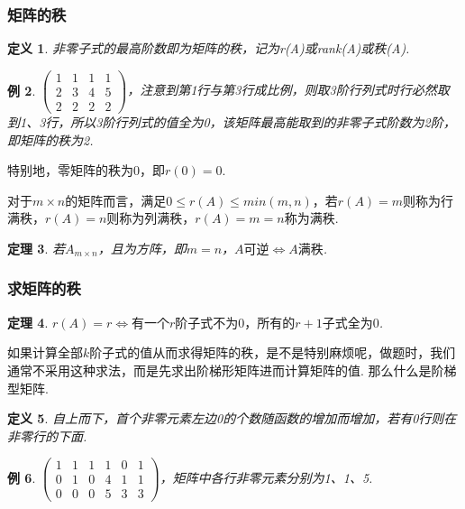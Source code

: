 \documentclass[12pt, a4paper, oneside]{ctexbook}
\newtheorem{theorem}{定理}[section]
\newtheorem{definition}[theorem]{定义}
\newtheorem{example}[theorem]{例}
\begin{document}
\subsubsection{矩阵的秩}

\begin{definition}
    非零子式的最高阶数即为矩阵的秩，记为r(A)或rank(A)或秩(A). 
\end{definition}

\begin{example}
    $\begin{pmatrix}
        1 & 1 & 1 & 1 \\
        2 & 3 & 4 & 5 \\
        2 & 2 & 2 & 2
    \end{pmatrix}$，注意到第1行与第3行成比例，则取3阶行列式时行必然取到1、3行，所以3阶行列式的值全为0，该矩阵最高能取到的非零子式阶数为2阶，即矩阵的秩为2. 
\end{example}

特别地，零矩阵的秩为0，即$r(0) = 0$. 


对于$m \times n$的矩阵而言，满足$0 \le r(A) \le min(m,n)$，若$r(A) = m$则称为行满秩，$r(A) = n$则称为列满秩，$r(A) = m = n$称为满秩. 

\begin{theorem}
    若$A_{m \times n}$，且为方阵，即$m = n$，$A \mbox{可逆} \Leftrightarrow A \mbox{满秩}$. 
\end{theorem}

\subsubsection{求矩阵的秩}

\begin{theorem}
    $r(A) = r \Leftrightarrow \mbox{有一个$r$阶子式不为0，所有的$r+1$子式全为0}$. 
\end{theorem}

如果计算全部$k$阶子式的值从而求得矩阵的秩，是不是特别麻烦呢，做题时，我们通常不采用这种求法，而是先求出阶梯形矩阵进而计算矩阵的值. 
那么什么是阶梯型矩阵. 

\begin{definition}
    自上而下，首个非零元素左边0的个数随函数的增加而增加，若有0行则在非零行的下面. 
\end{definition}

\begin{example}
    $\begin{pmatrix}
        1 & 1 & 1 & 1 & 0 & 1 \\
        0 & 1 & 0 & 4 & 1 & 1 \\
        0 & 0 & 0 & 5 & 3 & 3
    \end{pmatrix}$，矩阵中各行非零元素分别为1、1、5. 
\end{example}
\end{document}
